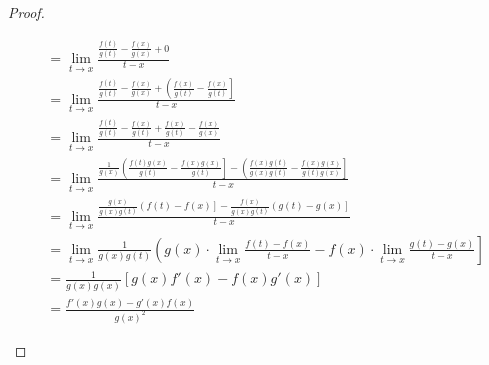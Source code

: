 \documentclass{article}
\theoremstyle{definition}
\begin{document}
\begin{proof}
\begin{enumerate}
\begin{align*}
				&=\lim\limits_{t\to x}\frac{\frac{f(t)}{g(t)}-\frac{f(x)}{g(x)}+0}{t-x}\\
				&=\lim\limits_{t\to x}\frac{\frac{f(t)}{g(t)}-\frac{f(x)}{g(x)}+\left(\frac{f(x)}{g(t)}-\frac{f(x)}{g(t)}\right]}{t-x}\\&=\lim\limits_{t\to x}\frac{\frac{f(t)}{g(t)}-\frac{f(x)}{g(t)}+\frac{f(x)}{g(t)}-\frac{f(x)}{g(x)}}{t-x}\\
				&=\lim\limits_{t\to x}\frac{\frac{1}{g(x)}\left(\frac{f(t)g(x)}{g(t)}-\frac{f(x)g(x)}{g(t)}\right]-\left(\frac{f(x)g(t)}{g(x)g(t)}-\frac{f(x)g(x)}{g(t)g(x)}\right]}{t-x}\\	&=\lim\limits_{t\to x}\frac{\frac{g(x)}{g(x)g(t)}\left(f(t)-f(x)\right]-\frac{f(x)}{g(x)g(t)}\left(g(t)-g(x)\right]}{t-x}\\
				&=\lim\limits_{t\to x}\frac{1}{g(x)g(t)}\left(g(x)\cdot\lim\limits_{t\to x}\frac{f(t)-f(x)}{t-x}-f(x)\cdot\lim\limits_{t\to x}\frac{g(t)-g(x)}{t-x}\right]\\&=\frac{1}{g(x)g(x)}[g(x)f'(x)-f(x)g'(x)]\\&=\frac{f'(x)g(x)-g'(x)f(x)}{g(x)^2}
			\end{align*}
			
		\end{enumerate}
	\end{proof}
	
\end{document}
